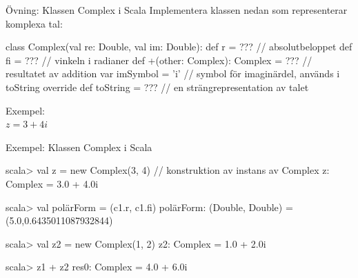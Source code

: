 \begin{Slide}{Övning: Klassen Complex i Scala}\SlideFontSmall
Implementera klassen  nedan som representerar komplexa tal:
\begin{Code}
  class Complex(val re: Double, val im: Double):
    def r  = ???  // absolutbeloppet
    def fi = ???  // vinkeln i radianer
    def +(other: Complex): Complex = ???  // resultatet av addition
    var imSymbol = 'i'  // symbol för imaginärdel, används i toString
    override def toString = ???  // en strängrepresentation av talet
\end{Code}

\begin{minipage}{0.3\textwidth}
  Exempel: \\$z = 3 + 4i$
\end{minipage}
\begin{minipage}{0.5\textwidth}
\end{minipage}

\end{Slide}


\begin{Slide}{Exempel: Klassen Complex i Scala}\SlideFontSmall
{}
\begin{REPL}
scala> val z = new Complex(3, 4)  // konstruktion av instans av Complex
z: Complex = 3.0 + 4.0i

scala> val polärForm = (c1.r, c1.fi)
polärForm: (Double, Double) = (5.0,0.6435011087932844)

scala> val z2 = new Complex(1, 2)
z2: Complex = 1.0 + 2.0i

scala> z1 + z2
res0: Complex = 4.0 + 6.0i
\end{REPL}
\end{Slide}



